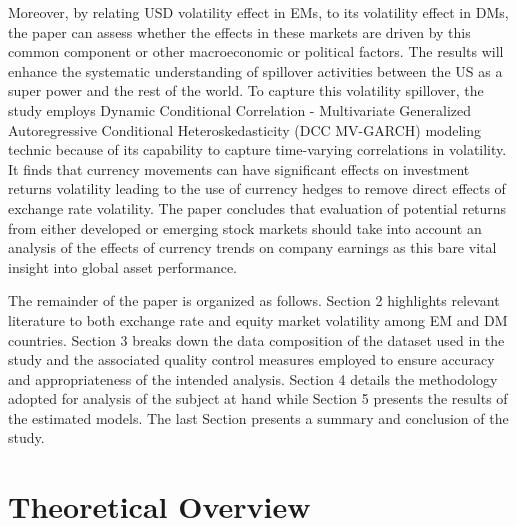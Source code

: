 \documentclass[11pt,preprint, authoryear]{elsarticle}
\numberwithin{equation}{section}
\numberwithin{figure}{section}
\numberwithin{table}{section}
\begin{document}
Moreover, by relating USD volatility effect in EMs, to its volatility
effect in DMs, the paper can assess whether the effects in these markets
are driven by this common component or other macroeconomic or political
factors. The results will enhance the systematic understanding of
spillover activities between the US as a super power and the rest of the
world. To capture this volatility spillover, the study employs Dynamic
Conditional Correlation - Multivariate Generalized Autoregressive
Conditional Heteroskedasticity (DCC MV-GARCH) modeling technic because
of its capability to capture time-varying correlations in volatility. It
finds that currency movements can have significant effects on investment
returns volatility leading to the use of currency hedges to remove
direct effects of exchange rate volatility. The paper concludes that
evaluation of potential returns from either developed or emerging stock
markets should take into account an analysis of the effects of currency
trends on company earnings as this bare vital insight into global asset
performance.

The remainder of the paper is organized as follows. Section 2 highlights
relevant literature to both exchange rate and equity market volatility
among EM and DM countries. Section 3 breaks down the data composition of
the dataset used in the study and the associated quality control
measures employed to ensure accuracy and appropriateness of the intended
analysis. Section 4 details the methodology adopted for analysis of the
subject at hand while Section 5 presents the results of the estimated
models. The last Section presents a summary and conclusion of the study.

\hypertarget{theoretical-overview}{%
\section{\texorpdfstring{Theoretical Overview
\label{Theorectical Overview}}{Theoretical Overview }}\label{theoretical-overview}}
\end{document}

